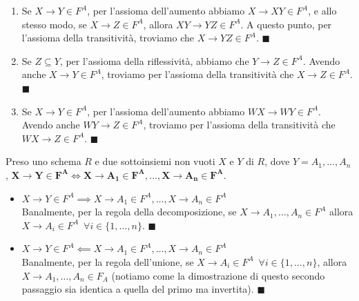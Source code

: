 \documentclass[11pt, a4paper, titlepage, oneside]{scrbook}
\begin{document}
\begin{enumerate}[start = 4]
    \item Se $X \longrightarrow Y \in F^A$, per l'assioma dell'aumento abbiamo $X \longrightarrow XY \in F^A$, e allo stesso modo, se $X \longrightarrow Z \in F^A$, allora $XY \longrightarrow YZ \in F^A$. A questo punto, per l'assioma della transitività, troviamo che $X \longrightarrow YZ \in F^A$. $\blacksquare$
    \item Se $Z \subseteq Y$, per l'assioma della riflessività, abbiamo che $Y \longrightarrow Z \in F^A$. Avendo anche $X \longrightarrow Y \in F^A$, troviamo per l'assioma della transitività che $X \longrightarrow Z \in F^A$. $\blacksquare$
    \item Se $X \longrightarrow Y \in F^A$, per l'assioma dell'aumento abbiamo $WX \longrightarrow WY \in F^A$. Avendo anche $WY \longrightarrow Z \in F^A$, troviamo per l'assioma della transitività che $WX \longrightarrow Z \in F^A$. $\blacksquare$
\end{enumerate}

\begin{Osservazione}[]
\label{oss-F-A}
Preso uno schema $R$ e due sottoinsiemi non vuoti $X$ e $Y$ di $R$, dove $Y = A_1, \ldots, A_n$, $\bm{X \longrightarrow Y \in F^A \iff X \longrightarrow A_1 \in F^A, \ldots, X \longrightarrow A_n \in F^A}$.
\end{Osservazione}

\vspace{2cm}

\Dimostrazione \nopagebreak

\begin{itemize}
    \item $X \longrightarrow Y \in F^A \implies X \longrightarrow A_1 \in F^A, \ldots, X \longrightarrow A_n \in F^A$ \\
    Banalmente, per la regola della decomposizione, se $X \longrightarrow A_1, \ldots, A_n \in F^A$ allora \mbox{$X \longrightarrow A_i \in F^A \enspace \forall i \in \{1, \ldots, n\}$}. $\blacksquare$
    \item $X \longrightarrow Y \in F^A \impliedby X \longrightarrow A_1 \in F^A, \ldots, X \longrightarrow A_n \in F^A$ \\
    Banalmente, per la regola dell'unione, se $X \longrightarrow A_i \in F^A \enspace \forall i \in \{1, \ldots, n\}$, allora \mbox{$X \longrightarrow A_1, \ldots, A_n \in F_A$} (notiamo come la dimostrazione di questo secondo passaggio sia identica a quella del primo ma invertita). $\blacksquare$
\end{itemize}
\end{document}
